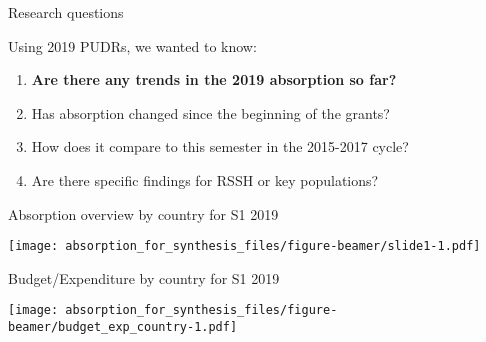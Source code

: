 \documentclass[ignorenonframetext,]{beamer}
\providecommand{\tightlist}{%
  \setlength{\itemsep}{0pt}\setlength{\parskip}{0pt}}
\begin{document}
\begin{frame}{Research questions}
\protect\hypertarget{research-questions-1}{}

Using 2019 PUDRs, we wanted to know:

\begin{enumerate}
\tightlist
\item
  \textbf{Are there any trends in the 2019 absorption so far?}
\item
  Has absorption changed since the beginning of the grants?
\item
  How does it compare to this semester in the 2015-2017 cycle?
\item
  Are there specific findings for RSSH or key populations?
\end{enumerate}

\end{frame}

\begin{frame}{Absorption overview by country for S1 2019}
\protect\hypertarget{absorption-overview-by-country-for-s1-2019}{}

\texttt{[image: absorption\_for\_synthesis\_files/figure-beamer/slide1-1.pdf]}

\end{frame}

\begin{frame}{Budget/Expenditure by country for S1 2019}
\protect\hypertarget{budgetexpenditure-by-country-for-s1-2019}{}

\texttt{[image: absorption\_for\_synthesis\_files/figure-beamer/budget\_exp\_country-1.pdf]}

\end{frame}
\end{document}
